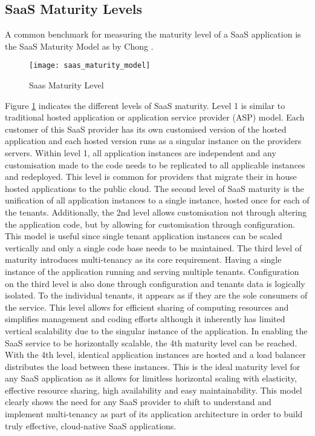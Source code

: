 \subsection{SaaS Maturity Levels}
A common benchmark for measuring the maturity level of a SaaS application is the SaaS Maturity Model as by Chong \cite{Chong2006}. \

\begin{figure}
\centering
\texttt{[image: saas\_maturity\_model]}
\caption{Saas Maturity Level}
\label{fig:saas_maturity}
\end{figure}

Figure \ref{fig:saas_maturity} indicates the different levels of SaaS maturity. Level 1 is similar to traditional hosted application or application service provider (ASP) model. Each customer of this SaaS provider has its own customised version of the hosted application and each hosted version runs as a singular instance on the providers servers. Within level 1, all application instances are independent and any customisation made to the code needs to be replicated to all applicable instances and redeployed. This level is common for providers that migrate their in house hosted applications to the public cloud. The second level of SaaS maturity is the unification of all application instances to a single instance, hosted once for each of the tenants. Additionally, the 2nd level allows customisation not through altering the application code, but by allowing for customisation through configuration. This model is useful since single tenant application instances can be scaled vertically and only a single code base needs to be maintained. The third level of maturity introduces multi-tenancy as its core requirement. Having a single instance of the application running and serving multiple tenants. Configuration on the third level is also done through configuration and tenants data is logically isolated. To the individual tenants, it appears as if they are the sole consumers of the service. This level allows for efficient sharing of computing resources and simplifies management and coding efforts although it inherently has limited vertical scalability due to the singular instance of the application. In enabling the SaaS service to be horizontally scalable, the 4th maturity level can be reached. With the 4th level, identical application instances are hosted and a load balancer distributes the load between these instances. This is the ideal maturity level for any SaaS application as it allows for limitless horizontal scaling with elasticity, effective resource sharing, high availability and easy maintainability. This model clearly shows the need for any SaaS provider to shift to understand and implement multi-tenancy as part of its application architecture in order to build truly effective, cloud-native SaaS applications.


